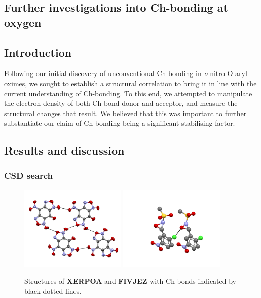 \begin{refsection}
\chapter{Further investigations into Ch-bonding at oxygen}\label{ch:o-ch-bonding-further}

\section{Introduction}
Following our initial discovery of unconventional Ch-bonding in \emph{o}-nitro-O-aryl oximes, we sought to establish a structural correlation to bring it in line with the current understanding of Ch-bonding.
To this end, we attempted to manipulate the electron density of both Ch-bond donor and acceptor, and measure the structural changes that result.
We believed that this was important to further substantiate our claim of Ch-bonding being a significant stabilising factor.

\section{Results and discussion}

\subsection{CSD search}

\begin{figure}
    \centering
    \includegraphics[width=0.45\textwidth]{Figures/XERPOA.pdf}
    \includegraphics[width=0.45\textwidth]{Figures/FIVJEZ.pdf}
    \caption[Structures of \textbf{XERPOA} and \textbf{FIVJEZ}.]{Structures of \textbf{XERPOA} and \textbf{FIVJEZ} with Ch-bonds indicated by black dotted lines.}\label{fig:furoxan-oxaziridine}
\end{figure}


\end{refsection}
